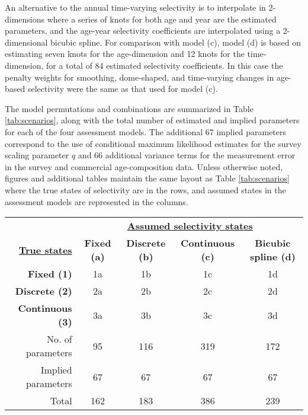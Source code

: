 \documentclass[review,letterpaper,10pt,authoryear]{elsarticle}
\begin{document}
An alternative to the annual time-varying selectivity is to interpolate in 2-dimensions where a series of knots for both age and year are the estimated parameters, and the age-year selectivity coefficients are interpolated using a 2-dimensional bicubic spline.  For comparison with model (c), model (d) is based on estimating seven knots for the age-dimension and 12 knots for the time-dimension, for a total of 84 estimated selectivity coefficients.  In this case the penalty weights for smoothing, dome-shaped, and time-varying changes in age-based selectivity were the same as that used for model (c).  

The model permutations and combinations are summarized in Table \ref{tab:scenarios}, along with the total number of estimated and implied parameters for each of the four assessment models.  The additional 67 implied parameters correspond to the use of conditional maximum likelihood estimates for the survey scaling parameter $q$ and 66 additional variance terms for the measurement error in the survey and commercial age-composition data.  Unless otherwise noted, figures and additional tables maintain the same layout as Table \ref{tab:scenarios} where the true states of selectivity are in the rows, and assumed states in the assessment models are represented in the columns.

\begin{table*}[!tbh]
	\caption{List of model scenarios and labels associated with each scenario explored.  For example, scenario 2a is based on simulated data with a fixed selectivity curve, but assumes 3 discrete time blocks in the assessment model.}
	\label{tab:scenarios}
	\begin{center}
		\begin{tabular}{r|cccc}
		\hline

		\hline
		
		&\multicolumn{4}{c}{\textbf{\underline{Assumed selectivity states}}}\\
		\textbf{\textbf{\underline{True states}}}
		&\textbf{Fixed (a)} & \textbf{Discrete (b)} & \textbf{Continuous (c)} & \textbf{Bicubic spline (d)} \\
		\hline
		 \textbf{Fixed (1)}      & 1a & 1b & 1c & 1d\\
		 \textbf{Discrete (2)}   & 2a & 2b & 2c & 2d\\
		 \textbf{Continuous (3)} & 3a & 3b & 3c & 3d\\
		\hline

		\hline
		No. of parameters & 95 & 116 & 319 & 172\\
		Implied parameters & 67 &67 &67 & 67 \\
		\hline
		Total  & 162 & 183 &  386 & 239 \\
		\hline

		\hline
		\end{tabular}
	\end{center}
\end{table*}
\end{document}

